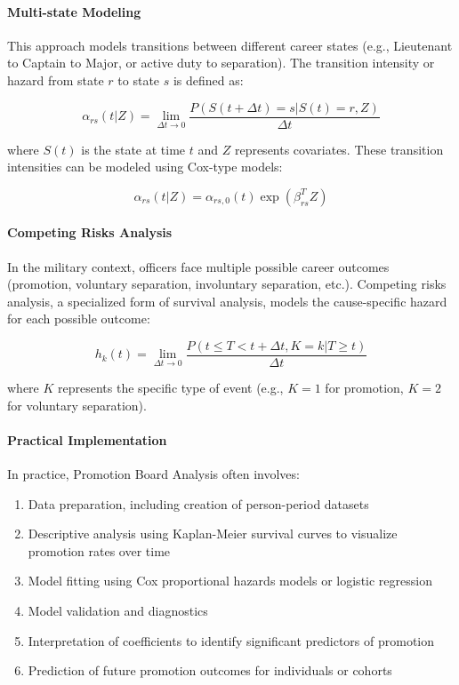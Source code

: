 \documentclass[../main.tex]{subfiles}
\begin{document}
\paragraph{Multi-state Modeling}
This approach models transitions between different career states (e.g., Lieutenant to Captain to Major, or active duty to separation). The transition intensity or hazard from state \(r\) to state \(s\) is defined as:

\[ \alpha_{rs}(t|Z) = \lim_{\Delta t \to 0} \frac{P(S(t + \Delta t) = s | S(t) = r, Z)}{\Delta t} \]

where \(S(t)\) is the state at time \(t\) and \(Z\) represents covariates. These transition intensities can be modeled using Cox-type models:

\[ \alpha_{rs}(t|Z) = \alpha_{rs,0}(t) \exp(\beta_{rs}^T Z) \]

\paragraph{Competing Risks Analysis}
In the military context, officers face multiple possible career outcomes (promotion, voluntary separation, involuntary separation, etc.). Competing risks analysis, a specialized form of survival analysis, models the cause-specific hazard for each possible outcome:

\[ h_k(t) = \lim_{\Delta t \to 0} \frac{P(t \leq T < t + \Delta t, K = k | T \geq t)}{\Delta t} \]

where \(K\) represents the specific type of event (e.g., \(K=1\) for promotion, \(K=2\) for voluntary separation).

\paragraph{Practical Implementation}
In practice, Promotion Board Analysis often involves:
\begin{enumerate}
\item Data preparation, including creation of person-period datasets
\item Descriptive analysis using Kaplan-Meier survival curves to visualize promotion rates over time
\item Model fitting using Cox proportional hazards models or logistic regression
\item Model validation and diagnostics
\item Interpretation of coefficients to identify significant predictors of promotion
\item Prediction of future promotion outcomes for individuals or cohorts
\end{enumerate}
\end{document}
